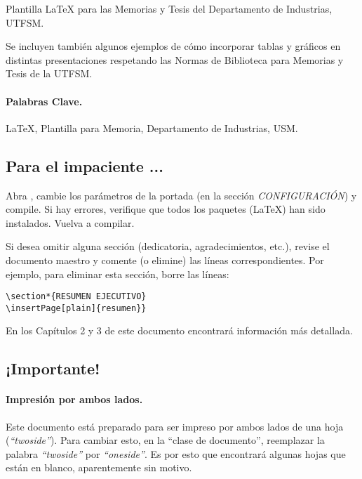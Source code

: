 
Plantilla \LaTeX{} para las Memorias y Tesis del Departamento de Industrias, UTFSM.

Se incluyen también algunos ejemplos de cómo incorporar tablas y gráficos en distintas presentaciones respetando las Normas de Biblioteca para Memorias y Tesis de la UTFSM.

\vspace{20mm}

\paragraph{Palabras Clave.}
\LaTeX{}, Plantilla para Memoria, Departamento de Industrias, USM.

\vspace{10mm}


\subsection*{\color{red}Para el impaciente ...}

Abra , cambie los parámetros de la portada (en la sección \emph{CONFIGURACIÓN}) y compile. Si hay errores, verifique que todos los paquetes (\LaTeX{}) han sido instalados. Vuelva a compilar.

Si desea omitir alguna sección (dedicatoria, agradecimientos, etc.), revise el documento maestro  y comente (o elimine) las líneas correspondientes. Por ejemplo, para eliminar esta sección, borre las líneas:

\begin{Verbatim}[frame=lines, label=\inlinecode{memoria.tex} (extracto)
, fontsize=\footnotesize
, baselinestretch=1
, formatcom=\color{gray}]
\section*{RESUMEN EJECUTIVO}
\insertPage[plain]{resumen}}
\end{Verbatim}

En los Capítulos 2 y 3 de este documento encontrará información más detallada.


\subsection*{\color{red}¡Importante!}

\paragraph{Impresión por ambos lados.}
Este documento está preparado para ser impreso por ambos lados de una hoja (\emph{``twoside''}). Para cambiar esto, en la ``clase de documento'', reemplazar la palabra \emph{``twoside''} por \emph{``oneside''}. Es por esto que encontrará algunas hojas que están en blanco, aparentemente sin motivo.


